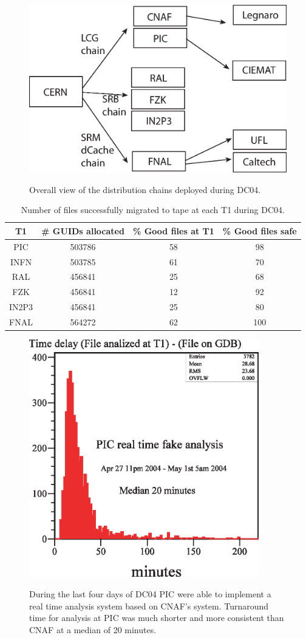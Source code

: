 \documentclass{cmspaper}
\begin{document}
\begin{figure}[tbp]
\centering
\includegraphics[width=15cm, angle = 90]{chains.eps}
\label{fig:chains}
\caption{Overall view of the distribution chains deployed during DC04.}
\end{figure}
\clearpage
\begin{table}
\centering
\begin{tabular}[tbp]{|c|c|c|c|}
\hline T1 & \# GUIDs allocated & \% Good files at T1 & \% Good files safe
\\ \hline PIC	& 503786	& 58 & 98
\\ INFN	& 503785	& 61 & 70
\\ RAL	& 456841	& 25 & 68
\\ FZK	& 456841	& 12 & 92
\\ IN2P3	& 456841	& 25 & 80
\\ FNAL	& 564272	& 62 & 100
\\ \hline
\end{tabular}
\label{table:migrated}
\caption{Number of files successfully migrated to tape at each T1 during DC04.}
\end{table}\clearpage
\begin{figure}[tbp]
\centering
\includegraphics[width=10cm]{PIC-RTA.eps}
\label{fig:PIC-RTA}
\caption{During the last four days of DC04 PIC were able to implement a real time analysis system based on CNAF's system. Turnaround time for analysis at PIC was much shorter and more consistent than CNAF at a median of 20 minutes. }
\end{figure}
\end{document}
